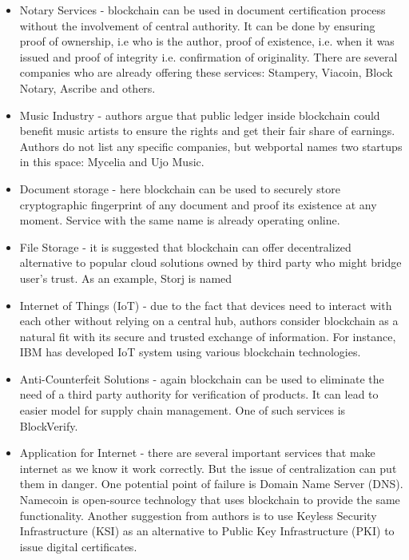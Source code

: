 \documentclass[conference,compsoc]{IEEEtran}
\begin{document}
\begin{itemize}
    \item Notary Services - blockchain can be used in document certification process without the involvement of central authority. 
    It can be done by ensuring proof of ownership, i.e who is the author, proof of existence, i.e. when it was issued and proof of integrity i.e. confirmation of originality.
    There are several companies who are already offering these services: Stampery, Viacoin, Block Notary, Ascribe and others.
    
    \item Music Industry - authors argue that public ledger inside blockchain could benefit music artists to ensure the rights and get their fair share of earnings. 
    Authors do not list any specific companies, but webportal \cite{futurethinkers} names two startups in this space: Mycelia and Ujo Music.
    
    \item Document storage - here blockchain can be used to securely store cryptographic fingerprint of any document and proof its existence at any moment. 
    Service with the same name is already operating online.
    
    \item File Storage - it is suggested that blockchain can offer decentralized alternative to popular cloud solutions owned by third party who might bridge user's trust. 
    As an example, Storj is named
    
    \item Internet of Things (IoT) - due to the fact that devices need to interact with each other without relying on a central hub, authors consider blockchain as a natural fit with its secure and trusted exchange of information. 
    For instance, IBM has developed IoT system using various blockchain technologies.
    
    \item Anti-Counterfeit Solutions - again blockchain can be used to eliminate the need of a third party authority for verification of products.
    It can lead to easier model for supply chain management.
    One of such services is BlockVerify.
    
    \item Application for Internet - there are several important services that make internet as we know it work correctly. 
    But the issue of centralization can put them in danger. 
    One potential point of failure is Domain Name Server (DNS). 
    Namecoin is open-source technology that uses blockchain to provide the same functionality.
    Another suggestion from authors is to use Keyless Security Infrastructure (KSI) as an alternative to Public Key Infrastructure (PKI) to issue digital certificates. 
\end{itemize}
\end{document}

